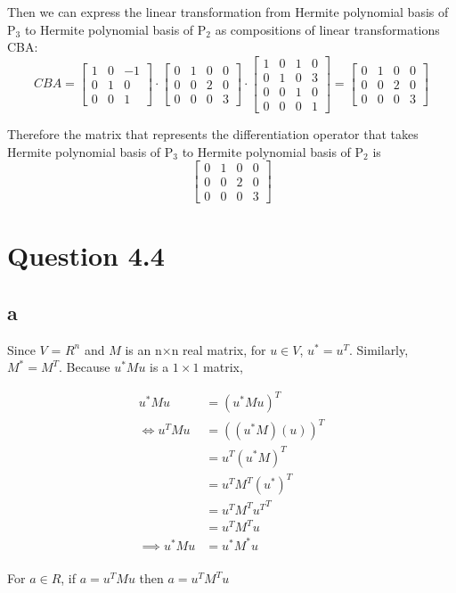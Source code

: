 \documentclass[11pt]{amsart}
\begin{document}
Then we can express the linear transformation from Hermite polynomial basis of P$_{3}$ to Hermite polynomial basis of  P$_{2}$ as compositions of linear transformations CBA:
\[
CBA = 
\begin{bmatrix}
1 & 0 & -1 \\
0 & 1 & 0 \\
0 & 0 & 1
\end{bmatrix} \cdot 
\begin{bmatrix}
0 & 1 & 0& 0 \\
0 & 0 & 2 & 0 \\
0 & 0 & 0 & 3 
\end{bmatrix}\cdot
\begin{bmatrix}
1 & 0 & 1& 0 \\
0 & 1 & 0 & 3 \\
0 & 0 & 1 & 0 \\
0 & 0 & 0 & 1
\end{bmatrix} =
\begin{bmatrix}
0 & 1 & 0& 0 \\
0 & 0 & 2 & 0 \\
0 & 0 & 0 & 3 
\end{bmatrix}
\]

Therefore the matrix that represents the differentiation operator that takes Hermite polynomial basis of P$_{3}$ to Hermite polynomial basis of P$_{2}$ is 
\[
\begin{bmatrix}
0 & 1 & 0& 0 \\
0 & 0 & 2 & 0 \\
0 & 0 & 0 & 3 
\end{bmatrix}
\]

\section*{Question 4.4}
\subsection*{a}
Since $V$ = $R^n$ and $M$ is an n$\times$n real matrix, for $u \in V$, $u^* = u^T$. Similarly, $M^* = M^T$. Because $u^*Mu$ is a $1\times1$ matrix,

\begin{align*}
u^*Mu &= (u^*Mu)^T\\
\iff u^TMu &= ((u^*M)(u))^T\\ &= u^T(u^*M)^T\\ &= u^TM^T(u^*)^T\\ &=u^TM^T{u^T}^T\\ &=u^TM^Tu\\
\implies u^*Mu &= u^*M^*u
\end{align*}
\\For $a \in R$, if $a= u^TMu$ then $a = u^TM^Tu$
\end{document}
